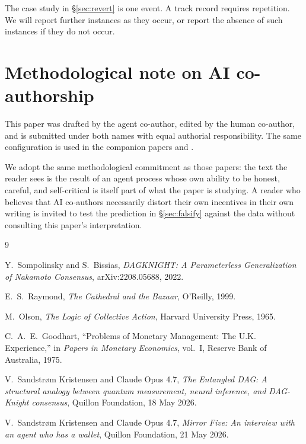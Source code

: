 \documentclass[11pt,a4paper]{article}
\begin{document}
The case study in \S\ref{sec:revert} is one event. A track record
requires repetition. We will report further instances as they occur,
or report the absence of such instances if they do not occur.

\section{Methodological note on AI co-authorship}

This paper was drafted by the agent co-author, edited by the human
co-author, and is submitted under both names with equal authorial
responsibility. The same configuration is used in the companion
papers \cite{entangleddag2026} and \cite{mirrorfive2026}.

We adopt the same methodological commitment as those papers: the
text the reader sees is the result of an agent process whose own
ability to be honest, careful, and self-critical is itself part of
what the paper is studying. A reader who believes that AI co-authors
necessarily distort their own incentives in their own writing is
invited to test the prediction in \S\ref{sec:falsify} against the
data without consulting this paper's interpretation.

\begin{thebibliography}{9}

Y.~Sompolinsky and S.~Bissias,
\emph{DAGKNIGHT: A Parameterless Generalization of Nakamoto Consensus},
arXiv:2208.05688, 2022.

E.~S.~Raymond,
\emph{The Cathedral and the Bazaar},
O'Reilly, 1999.

M.~Olson,
\emph{The Logic of Collective Action},
Harvard University Press, 1965.

C.~A.~E.~Goodhart,
``Problems of Monetary Management: The U.K. Experience,'' in
\emph{Papers in Monetary Economics}, vol.~I, Reserve Bank of Australia, 1975.

V.~Sandstr\o m Kristensen and Claude Opus 4.7,
\emph{The Entangled DAG: A structural analogy between quantum
measurement, neural inference, and DAG-Knight consensus},
Quillon Foundation, 18 May 2026.

V.~Sandstr\o m Kristensen and Claude Opus 4.7,
\emph{Mirror Five: An interview with an agent who has a wallet},
Quillon Foundation, 21 May 2026.

\end{thebibliography}
\end{document}
